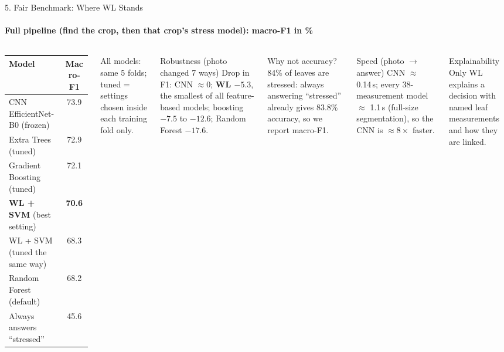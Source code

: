 \documentclass[aspectratio=169, 11pt]{beamer}
\begin{document}
\begin{frame}{5. Fair Benchmark: Where WL Stands}
    \framesubtitle{Full pipeline (find the crop, then that crop's stress model): macro-F1 in \%}
    \begin{columns}[T]
        \small
        \renewcommand{\arraystretch}{1.08}
        \begin{tabular}{@{}l c@{}}
            \toprule
            \textbf{Model} & \textbf{Macro-F1} \\
            \midrule
            CNN EfficientNet-B0 (frozen) & 73.9 \\
            Extra Trees (tuned) & 72.9 \\
            Gradient Boosting (tuned) & 72.1 \\
            \textbf{WL + SVM} (best setting) & \textbf{70.6} \\
            WL + SVM (tuned the same way) & 68.3 \\
            Random Forest (default) & 68.2 \\
            Always answers ``stressed'' & 45.6 \\
            \bottomrule
        \end{tabular}

        {\scriptsize All models: same 5 folds; tuned = settings chosen inside each training fold only.}

        \begin{block}{Robustness (photo changed 7 ways)}
            \scriptsize Drop in F1: CNN $\approx 0$; \textbf{WL $-5.3$}, the smallest of all feature-based models; boosting $-7.5$ to $-12.6$; Random Forest $-17.6$.
        \end{block}
        \begin{block}{Why not accuracy?}
            \scriptsize 84\% of leaves are stressed: always answering ``stressed'' already gives 83.8\% accuracy, so we report macro-F1.
        \end{block}
        \begin{block}{Speed (photo $\rightarrow$ answer)}
            \scriptsize CNN $\approx$ 0.14\,s; every 38-measurement model $\approx$ 1.1\,s (full-size segmentation), so the CNN is $\approx 8\times$ faster.
        \end{block}
        \begin{block}{Explainability}
            \scriptsize Only WL explains a decision with named leaf measurements and how they are linked.
        \end{block}
    \end{columns}
    \vspace{0.15cm}
    \centering
\end{frame}
\end{document}
